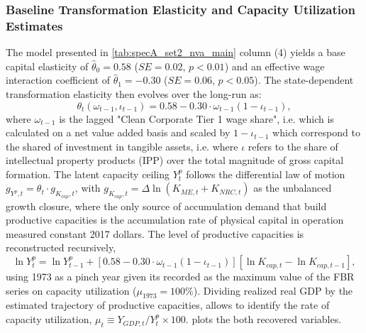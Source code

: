 


\subsubsection{Baseline Transformation Elasticity and Capacity Utilization Estimates}
\label{sec:42:baseline_capacity}

The model presented in \cref{tab:specA_set2_nva_main} column (4) yields a base capital
elasticity of $\hat{\theta}_0 = 0.58$ ($SE = 0.02$, $p < 0.01$)
and an effective wage interaction coefficient of
$\hat{\theta}_1 = -0.30$ ($SE = 0.06$, $p < 0.05$). The
state-dependent transformation elasticity then evolves over the long-run as: 
\begin{equation}
	\theta_t(\omega_{t-1}, \iota_{t-1})
	= 0.58 - 0.30 \cdot \omega_{t-1}(1 - \iota_{t-1}),
	\label{eq:42:theta_state}
\end{equation}
where $\omega_{t-1}$ is the lagged "Clean Corporate Tier 1 wage
share", i.e. which is calculated on a net value added basis and scaled by $1-\iota_{t-1}$ which correspond to the shared of investment in tangible assets, i.e.  where $\iota$ refers to the
share of intellectual property products (IPP) over the total magnitude of gross capital formation. The latent capacity ceiling $Y_t^p$ follows the
differential law of motion $g_{Y^p,t} = \theta_t \cdot
g_{K_{cap},t}$, with $g_{K_{cap},t} = \Delta \ln(K_{ME,t} +
K_{NRC,t})$ as the unbalanced growth closure, where the only source of accumulation demand that build productive capacities is the accumulation rate of physical capital in operation measured constant 2017 dollars. The level of productive capacities is reconstructed recursively,
\begin{equation}
	\ln Y_t^p = \ln Y_{t-1}^p
	+ \left[ 0.58 - 0.30 \cdot \omega_{t-1}(1 - \iota_{t-1}) \right]
	\left[ \ln K_{cap,t} - \ln K_{cap,t-1} \right],
	\label{eq:42:yp_recursion}
\end{equation}
using 1973 as a pinch year given its recorded as the maximum value of the FBR series on capacity utilization ($\mu_{1973} = 100\%$). Dividing
realized real GDP by the estimated trajectory of productive capacities, allows to identify the rate of 
capacity utilization, $\mu_t \equiv Y_{GDP,t}/Y_t^p \times 100$.
 plots the both recovered variables. 

